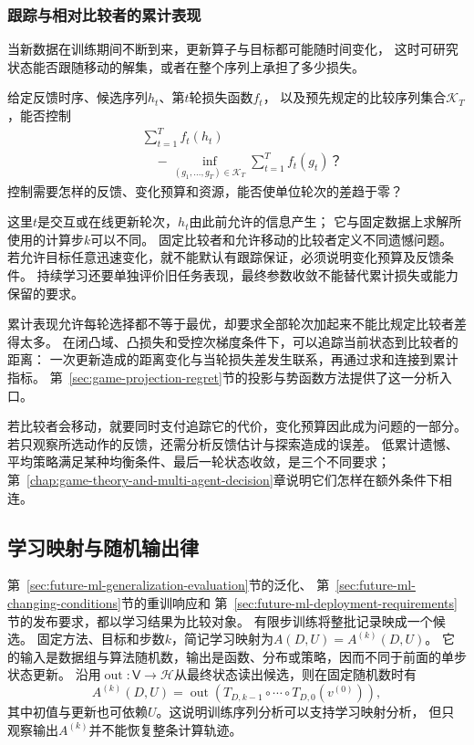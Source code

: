 \subsubsection{跟踪与相对比较者的累计表现}
\label{sec:future-analysis-cumulative-comparison}

当新数据在训练期间不断到来，更新算子与目标都可能随时间变化，
这时可研究状态能否跟随移动的解集，或者在整个序列上承担了多少损失。

\begin{mathproblem}[序列相对于比较者的累计表现]
  \label{question:future-cumulative-comparison}
  给定反馈时序、候选序列$h_t$、第$t$轮损失函数$f_t$，
  以及预先规定的比较序列集合$\mathcal K_T$，能否控制
  \[
    \begin{aligned}
      &\sum_{t=1}^Tf_t(h_t)\\
      &\quad-\inf_{(g_1,\ldots,g_T)\in\mathcal K_T}
         \sum_{t=1}^Tf_t(g_t)\text{？}
    \end{aligned}
  \]
  控制需要怎样的反馈、变化预算和资源，能否使单位轮次的差趋于零？
\end{mathproblem}

这里$t$是交互或在线更新轮次，$h_t$由此前允许的信息产生；
它与固定数据上求解所使用的计算步$k$可以不同。
固定比较者和允许移动的比较者定义不同遗憾问题。
若允许目标任意迅速变化，就不能默认有跟踪保证，必须说明变化预算及反馈条件。
持续学习还要单独评价旧任务表现，最终参数收敛不能替代累计损失或能力保留的要求。

累计表现允许每轮选择都不等于最优，却要求全部轮次加起来不能比规定比较者差得太多。
在闭凸域、凸损失和受控次梯度条件下，可以追踪当前状态到比较者的距离：
一次更新造成的距离变化与当轮损失差发生联系，再通过求和连接到累计指标。
第~\ref{sec:game-projection-regret}节的投影与势函数方法提供了这一分析入口。

若比较者会移动，就要同时支付追踪它的代价，变化预算因此成为问题的一部分。
若只观察所选动作的反馈，还需分析反馈估计与探索造成的误差。
低累计遗憾、平均策略满足某种均衡条件、最后一轮状态收敛，是三个不同要求；
第~\ref{chap:game-theory-and-multi-agent-decision}章说明它们怎样在额外条件下相连。

\subsection{学习映射与随机输出律}
\label{sec:future-generalization-learnability-map}
\label{sec:future-privacy-unlearning-map}

第~\ref{sec:future-ml-generalization-evaluation}节的泛化、
第~\ref{sec:future-ml-changing-conditions}节的重训响应和
第~\ref{sec:future-ml-deployment-requirements}节的发布要求，都以学习结果为比较对象。
有限步训练将整批记录映成一个候选。
固定方法、目标和步数$k$，简记学习映射为$A(D,U)=A^{(k)}(D,U)$。
它的输入是数据组与算法随机数，输出是函数、分布或策略，因而不同于前面的单步状态更新。
沿用$\operatorname{out}:\mathsf V\to\mathcal H$从最终状态读出候选，则在固定随机数时有
\[
  A^{(k)}(D,U)=\operatorname{out}\!\left(
    T_{D,k-1}\circ\cdots\circ T_{D,0}(v^{(0)})\right),
\]
其中初值与更新也可依赖$U$。这说明训练序列分析可以支持学习映射分析，
但只观察输出$A^{(k)}$并不能恢复整条计算轨迹。

